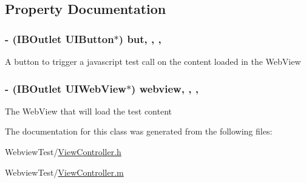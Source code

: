 \subsection{Property Documentation}
\hypertarget{interface_view_controller_ad839c30ee296cfa982923261103473e8}{
\subsubsection[{but}]{\setlength{\rightskip}{0pt plus 5cm}-\/ (I\-B\-Outlet U\-I\-Button$\ast$) but\hspace{0.3cm}{\ttfamily [read]}, {\ttfamily [write]}, {\ttfamily [nonatomic]}, {\ttfamily [weak]}}}\label{interface_view_controller_ad839c30ee296cfa982923261103473e8}
A button to trigger a javascript test call on the content loaded in the Web\-View \hypertarget{interface_view_controller_ab7e91cb8cf4ad3747ee6a634897a9f2f}{
\subsubsection[{webview}]{\setlength{\rightskip}{0pt plus 5cm}-\/ (I\-B\-Outlet U\-I\-Web\-View$\ast$) webview\hspace{0.3cm}{\ttfamily [read]}, {\ttfamily [write]}, {\ttfamily [nonatomic]}, {\ttfamily [weak]}}}\label{interface_view_controller_ab7e91cb8cf4ad3747ee6a634897a9f2f}
The Web\-View that will load the test content 

The documentation for this class was generated from the following files\-:\begin{DoxyCompactItemize}
\item 
Webview\-Test/\hyperlink{_view_controller_8h}{View\-Controller.\-h}\item 
Webview\-Test/\hyperlink{_view_controller_8m}{View\-Controller.\-m}\end{DoxyCompactItemize}
